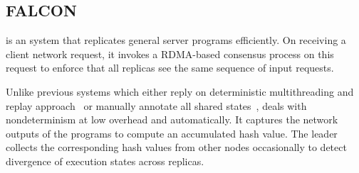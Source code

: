 \subsection{FALCON} \label{sec:falcon}

\smrsystem is an \smr system that replicates general server programs efficiently. On 
receiving a client network request, it invokes a RDMA-based consensus process on this 
request to enforce that all replicas see the same sequence of input requests. 

Unlike previous \smr systems which either reply on deterministic multithreading and replay
approach~\cite{rex:eurosys14} or manually annotate all shared states~\cite{eve:osdi12}, 
\smrsystem deals with nondeterminism at low overhead and automatically. It captures the 
network outputs of the programs to compute an accumulated hash value. The leader collects 
the corresponding hash values from other nodes occasionally to detect divergence of execution 
states across replicas.
